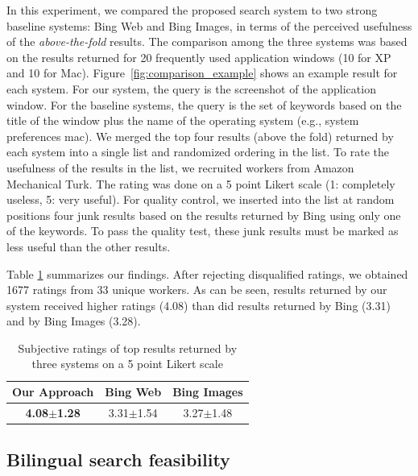 \documentclass{www2010-submission}
\begin{document}
In this experiment, we compared the proposed search system to two
strong baseline systems: Bing Web and Bing Images, in terms of the
perceived usefulness of the \emph{above-the-fold} results. The
comparison among the three systems was based on the results returned
for 20 frequently used application windows (10 for XP and 10
for Mac). Figure~\ref{fig:comparison_example} shows an example
result for each system. For our system, the query is the screenshot
of the application window. For the baseline systems, the query is the
set of keywords based on the title of the window plus the name of the
operating system (e.g., system preferences mac). We merged the top
four results (above the fold) returned by each system into a single
list and randomized ordering in the list. To rate the usefulness of
the results in the list, we recruited workers from Amazon Mechanical
Turk. The rating was done on a 5 point Likert scale (1: completely
useless, 5: very useful). For quality control, we inserted into the
list at random positions four junk results based on the results
returned by Bing using only one of the keywords. To pass the quality
test, these junk results must be marked as less useful than the other
results.

Table \ref{tbl:comparison_results} summarizes our findings. After
rejecting disqualified ratings, we obtained 1677 ratings from 33
unique workers. As can be seen, results returned by our system
received higher ratings (4.08) than did results returned by Bing
(3.31) and by Bing Images (3.28).

\begin{table}
\centering \caption{Subjective ratings of top results returned by
three systems on a 5 point Likert scale}
\label{tbl:comparison_results}
\vspace{0.2cm}
\begin{tabular}{|c|c|c|}
\hline
        \textbf{Our Approach} & Bing Web & Bing Images \\
\hline
 \textbf{4.08$\pm$1.28} & 3.31$\pm$1.54 & 3.27$\pm$1.48 \\

\hline
\end{tabular}

\end{table}

\subsection{Bilingual search feasibility}
\end{document}
